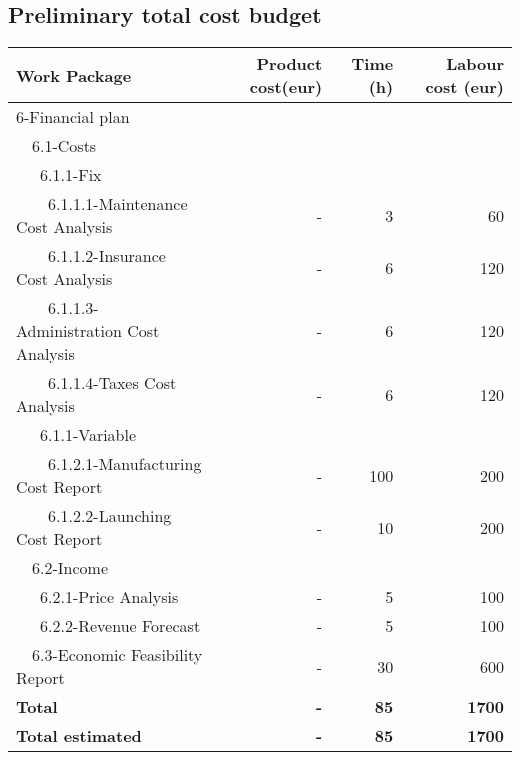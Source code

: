 \documentclass[12pt, titlepage]{article}
\begin{document}
\subsection{Preliminary total cost budget} 
\begin{tabular}{ | l | r | r | r | }
\hline
Work Package & Product cost(eur) & Time (h) & Labour cost (eur) \\ \hline
6-Financial plan &  &  \\ \hline
~~6.1-Costs & & & \\ \hline
~~~6.1.1-Fix & & & \\ \hline
~~~~6.1.1.1-Maintenance Cost Analysis & - & 3 & 60 \\ \hline
~~~~6.1.1.2-Insurance Cost Analysis & - & 6 & 120 \\ \hline
~~~~6.1.1.3-Administration Cost Analysis & - & 6 & 120 \\ \hline
~~~~6.1.1.4-Taxes Cost Analysis  & - & 6 & 120\\ \hline
~~~6.1.1-Variable & & & \\ \hline
~~~~6.1.2.1-Manufacturing Cost Report & - & 100 & 200  \\ \hline
~~~~6.1.2.2-Launching Cost Report & - & 10 & 200 \\ \hline
~~6.2-Income &  & & \\ \hline
~~~6.2.1-Price Analysis & - & 5 & 100 \\ \hline
~~~6.2.2-Revenue Forecast & - & 5 & 100\\ \hline
~~6.3-Economic Feasibility Report & -  & 30 & 600  \\ \hline
\textbf{Total} & \textbf{-} & \textbf{85} & \textbf{1700} \\ \hline
\textbf{Total estimated} & \textbf{-} & \textbf{85} & \textbf{1700} \\
\hline
\end{tabular}


\pagebreak


\end{document}
